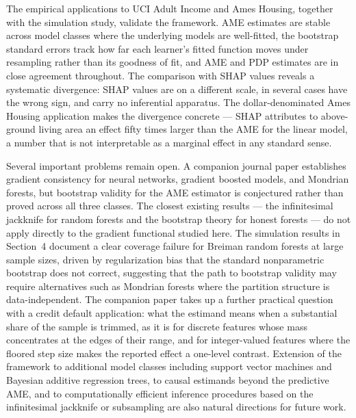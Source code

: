 \documentclass[conference]{IEEEtran}
\begin{document}
	The empirical applications to UCI Adult Income and Ames Housing, together with the simulation study, validate the framework. AME estimates are stable across model classes where the underlying models are well-fitted, the bootstrap standard errors track how far each learner's fitted function moves under resampling rather than its goodness of fit, and AME and PDP estimates are in close agreement throughout. The comparison with SHAP values reveals a systematic divergence: SHAP values are on a different scale, in several cases have the wrong sign, and carry no inferential apparatus. The dollar-denominated Ames Housing application makes the divergence concrete --- SHAP attributes to above-ground living area an effect fifty times larger than the AME for the linear model, a number that is not interpretable as a marginal effect in any standard sense.
	
	Several important problems remain open. A companion journal paper establishes gradient consistency for neural networks, gradient boosted models, and Mondrian forests, but bootstrap validity for the AME estimator is conjectured rather than proved across all three classes. The closest existing results --- the infinitesimal jackknife for random forests \cite{wager2014confidence} and the bootstrap theory for honest forests \cite{wager2018forests} --- do not apply directly to the gradient functional studied here. The simulation results in Section~4 document a clear coverage failure for Breiman random forests at large sample sizes, driven by regularization bias that the standard nonparametric bootstrap does not correct, suggesting that the path to bootstrap validity may require alternatives such as Mondrian forests where the partition structure is data-independent. The companion paper takes up a further practical question with a credit default application: what the estimand means when a substantial share of the sample is trimmed, as it is for discrete features whose mass concentrates at the edges of their range, and for integer-valued features where the floored step size makes the reported effect a one-level contrast. Extension of the framework to additional model classes including support vector machines and Bayesian additive regression trees, to causal estimands beyond the predictive AME, and to computationally efficient inference procedures based on the infinitesimal jackknife or subsampling are also natural directions for future work.
	
	
	
	
\end{document}
